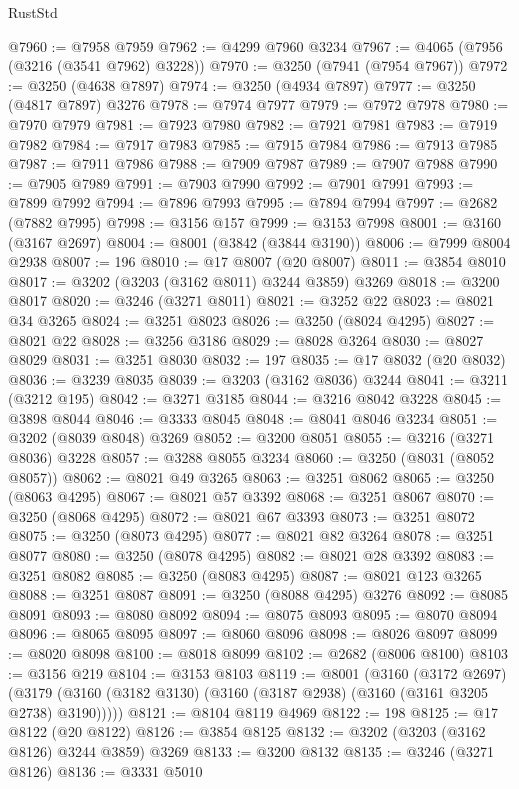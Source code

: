 \begin{lexlean}{RustStd}
\begin{coremodule}
@7960 := @7958 @7959
@7962 := @4299 @7960 @3234
@7967 := @4065 (@7956 (@3216 (@3541 @7962) @3228))
@7970 := @3250 (@7941 (@7954 @7967))
@7972 := @3250 (@4638 @7897)
@7974 := @3250 (@4934 @7897)
@7977 := @3250 (@4817 @7897) @3276
@7978 := @7974 @7977
@7979 := @7972 @7978
@7980 := @7970 @7979
@7981 := @7923 @7980
@7982 := @7921 @7981
@7983 := @7919 @7982
@7984 := @7917 @7983
@7985 := @7915 @7984
@7986 := @7913 @7985
@7987 := @7911 @7986
@7988 := @7909 @7987
@7989 := @7907 @7988
@7990 := @7905 @7989
@7991 := @7903 @7990
@7992 := @7901 @7991
@7993 := @7899 @7992
@7994 := @7896 @7993
@7995 := @7894 @7994
@7997 := @2682 (@7882 @7995)
@7998 := @3156 @157
@7999 := @3153 @7998
@8001 := @3160 (@3167 @2697)
@8004 := @8001 (@3842 (@3844 @3190))
@8006 := @7999 @8004 @2938
@8007 := 196
@8010 := @17 @8007 (@20 @8007)
@8011 := @3854 @8010
@8017 := @3202 (@3203 (@3162 @8011) @3244 @3859) @3269
@8018 := @3200 @8017
@8020 := @3246 (@3271 @8011)
@8021 := @3252 @22
@8023 := @8021 @34 @3265
@8024 := @3251 @8023
@8026 := @3250 (@8024 @4295)
@8027 := @8021 @22
@8028 := @3256 @3186
@8029 := @8028 @3264
@8030 := @8027 @8029
@8031 := @3251 @8030
@8032 := 197
@8035 := @17 @8032 (@20 @8032)
@8036 := @3239 @8035
@8039 := @3203 (@3162 @8036) @3244
@8041 := @3211 (@3212 @195)
@8042 := @3271 @3185
@8044 := @3216 @8042 @3228
@8045 := @3898 @8044
@8046 := @3333 @8045
@8048 := @8041 @8046 @3234
@8051 := @3202 (@8039 @8048) @3269
@8052 := @3200 @8051
@8055 := @3216 (@3271 @8036) @3228
@8057 := @3288 @8055 @3234
@8060 := @3250 (@8031 (@8052 @8057))
@8062 := @8021 @49 @3265
@8063 := @3251 @8062
@8065 := @3250 (@8063 @4295)
@8067 := @8021 @57 @3392
@8068 := @3251 @8067
@8070 := @3250 (@8068 @4295)
@8072 := @8021 @67 @3393
@8073 := @3251 @8072
@8075 := @3250 (@8073 @4295)
@8077 := @8021 @82 @3264
@8078 := @3251 @8077
@8080 := @3250 (@8078 @4295)
@8082 := @8021 @28 @3392
@8083 := @3251 @8082
@8085 := @3250 (@8083 @4295)
@8087 := @8021 @123 @3265
@8088 := @3251 @8087
@8091 := @3250 (@8088 @4295) @3276
@8092 := @8085 @8091
@8093 := @8080 @8092
@8094 := @8075 @8093
@8095 := @8070 @8094
@8096 := @8065 @8095
@8097 := @8060 @8096
@8098 := @8026 @8097
@8099 := @8020 @8098
@8100 := @8018 @8099
@8102 := @2682 (@8006 @8100)
@8103 := @3156 @219
@8104 := @3153 @8103
@8119 := @8001
    (@3160
      (@3172 @2697)
      (@3179 (@3160 (@3182 @3130) (@3160 (@3187 @2938) (@3160 (@3161 @3205 @2738) @3190)))))
@8121 := @8104 @8119 @4969
@8122 := 198
@8125 := @17 @8122 (@20 @8122)
@8126 := @3854 @8125
@8132 := @3202 (@3203 (@3162 @8126) @3244 @3859) @3269
@8133 := @3200 @8132
@8135 := @3246 (@3271 @8126)
@8136 := @3331 @5010

\end{coremodule}
\end{lexlean}
